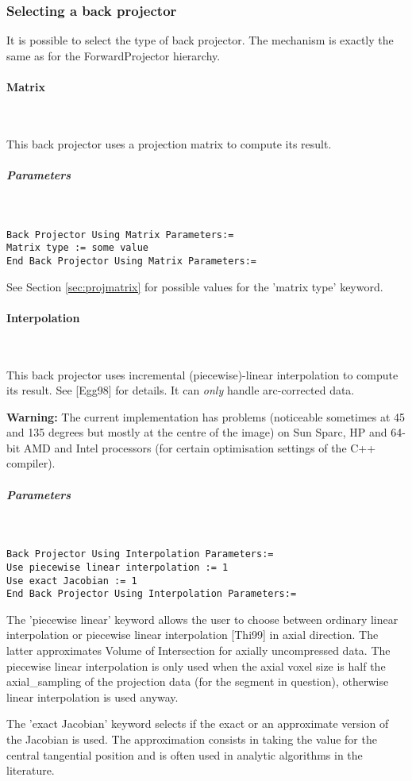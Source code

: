 \documentclass{article}
\newcommand{\subsubsubsection}[1]{\paragraph{#1}\mbox{} \\}
\newcommand{\subsubsubsubsection}[1]{\subparagraph{#1} \mbox{} \\}
\begin{document}
{{{\subsubsection{
Selecting a back projector}
\label{sec:backprojectors}
It is possible to select the type of back projector. The mechanism 
is exactly the same as for the ForwardProjector hierarchy.

{ \subsubsubsection{Matrix}
}
This back projector uses a projection matrix to compute its result.

{ \subsubsubsubsection{Parameters}
}
\begin{verbatim}
Back Projector Using Matrix Parameters:=
Matrix type := some value
End Back Projector Using Matrix Parameters:=
\end{verbatim}

See Section \ref{sec:projmatrix} for possible values for the 'matrix type' keyword.

{ \subsubsubsection{Interpolation}
}
\label{sec:IncrementalInterpolationBackProjector}
This back projector uses incremental (piecewise)-linear interpolation 
to compute its result. See [Egg98] for details. It can \textit{only} handle arc-corrected data.


\textbf{Warning:} The current implementation has problems (noticeable 
sometimes at 45 and 135 degrees but mostly at the centre of the image) on Sun 
Sparc, HP and 64-bit AMD and Intel processors (for certain optimisation settings
of the C++ compiler).

{ \subsubsubsubsection{Parameters}
}
\begin{verbatim}
Back Projector Using Interpolation Parameters:=
Use piecewise linear interpolation := 1
Use exact Jacobian := 1
End Back Projector Using Interpolation Parameters:=
\end{verbatim}

The 'piecewise linear' keyword allows the user to choose between 
ordinary linear interpolation or piecewise linear interpolation 
[Thi99] in axial direction. The latter approximates Volume of 
Intersection for axially uncompressed data. The piecewise linear 
interpolation is only used when the axial voxel size is half 
the axial\_sampling of the projection data (for the segment in 
question), otherwise linear interpolation is used anyway.


The 'exact Jacobian' keyword selects if the exact or an approximate 
version of the Jacobian is used. The approximation consists in 
taking the value for the central tangential position and is often 
used in analytic algorithms in the literature.


}}}
\end{document}
